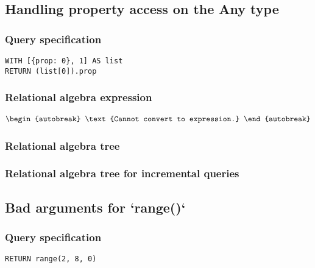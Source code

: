 \subsection{Handling property access on the Any type}

\subsubsection*{Query specification}

\begin{lstlisting}
WITH [{prop: 0}, 1] AS list
RETURN (list[0]).prop
\end{lstlisting}

\subsubsection*{Relational algebra expression}

\begin{align*}
\begin{autobreak}
\text{Cannot convert to expression.}
\end{autobreak}
\end{align*}

\subsubsection*{Relational algebra tree}


\subsubsection*{Relational algebra tree for incremental queries}


\subsection{Bad arguments for `range()`}

\subsubsection*{Query specification}

\begin{lstlisting}
RETURN range(2, 8, 0)
\end{lstlisting}

